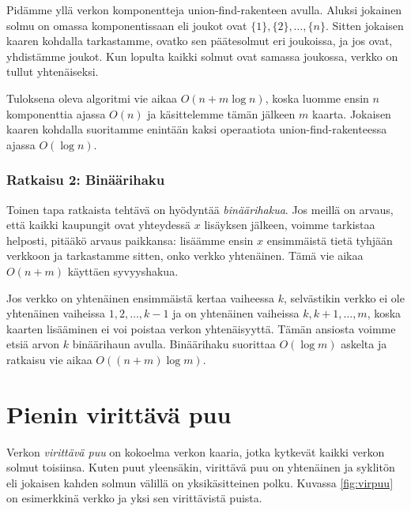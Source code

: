 Pidämme yllä verkon komponentteja
union-find-rakenteen avulla.
Aluksi jokainen solmu on omassa komponentissaan
eli joukot ovat $\{1\},\{2\},\dots,\{n\}$.
Sitten jokaisen kaaren kohdalla tarkastamme,
ovatko sen päätesolmut eri joukoissa,
ja jos ovat, yhdistämme joukot.
Kun lopulta kaikki solmut ovat samassa joukossa,
verkko on tullut yhtenäiseksi.

Tuloksena oleva algoritmi vie aikaa $O(n+m \log n)$,
koska luomme ensin $n$ komponenttia ajassa $O(n)$
ja käsittelemme tämän jälkeen $m$ kaarta.
Jokaisen kaaren kohdalla suoritamme enintään kaksi
operaatiota union-find-rakenteessa ajassa $O(\log n)$.

\subsubsection{Ratkaisu 2: Binäärihaku}

Toinen tapa ratkaista tehtävä on hyödyntää \emph{binäärihakua}.
Jos meillä on arvaus, että kaikki kaupungit ovat yhteydessä
$x$ lisäyksen jälkeen, voimme tarkistaa helposti,
pitääkö arvaus paikkansa:
lisäämme ensin $x$ ensimmäistä tietä tyhjään verkkoon ja tarkastamme
sitten, onko verkko yhtenäinen. Tämä vie aikaa $O(n+m)$
käyttäen syvyyshakua.

Jos verkko on yhtenäinen ensimmäistä kertaa vaiheessa $k$,
selvästikin verkko ei ole yhtenäinen vaiheissa
$1,2,\dots,k-1$ ja on yhtenäinen vaiheissa $k,k+1,\dots,m$,
koska kaarten lisääminen ei voi poistaa verkon yhtenäisyyttä.
Tämän ansiosta voimme etsiä arvon $k$ binäärihaun avulla.
Binäärihaku suorittaa $O(\log m)$ askelta ja ratkaisu vie
aikaa $O((n+m) \log m)$.

\section{Pienin virittävä puu}


Verkon \emph{virittävä puu} on kokoelma verkon kaaria,
jotka kytkevät kaikki verkon solmut toisiinsa.
Kuten puut yleensäkin, virittävä puu on yhtenäinen ja syklitön eli
jokaisen kahden solmun välillä on yksikäsitteinen polku.
Kuvassa \ref{fig:virpuu} on esimerkkinä verkko ja yksi sen virittävistä puista.

